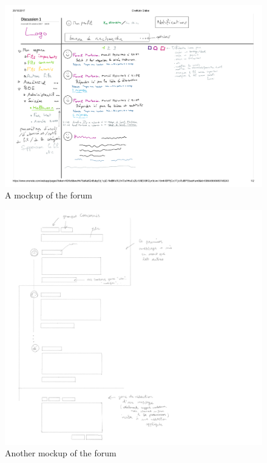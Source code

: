 \documentclass[a4paper, english]{report}
\begin{document}
\begin{figure}[h]
\centering
\includegraphics[width=\linewidth,trim={0 1cm 0 1cm},clip]{mockups/discussion-alex.pdf}
\caption{A mockup of the forum}
\label{fig:mockup-discussion1}
\end{figure}

\begin{figure}[h]
\centering
\includegraphics[width=\linewidth,trim={0 1cm 0 1cm},clip]{mockups/discussion-flupe.png}
\caption{Another mockup of the forum}
\label{fig:mockup-discussion2}
\end{figure}


\printbibliography
\end{document}
